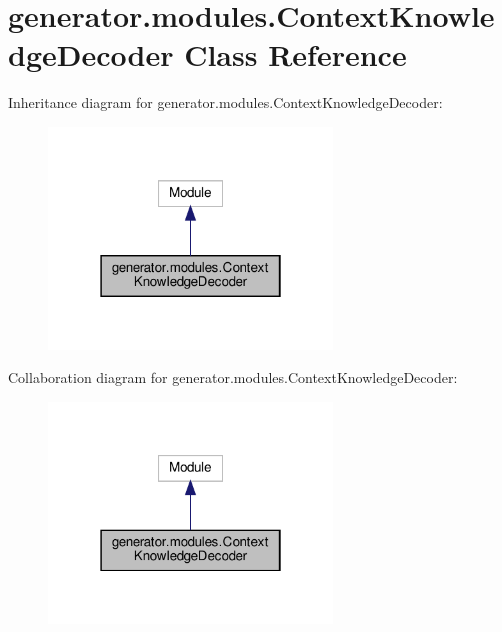 \hypertarget{classgenerator_1_1modules_1_1ContextKnowledgeDecoder}{}\section{generator.\+modules.\+Context\+Knowledge\+Decoder Class Reference}
\label{classgenerator_1_1modules_1_1ContextKnowledgeDecoder}


Inheritance diagram for generator.\+modules.\+Context\+Knowledge\+Decoder\+:
\nopagebreak
\begin{figure}[H]
\begin{center}
\leavevmode
\includegraphics[width=214pt]{classgenerator_1_1modules_1_1ContextKnowledgeDecoder__inherit__graph}
\end{center}
\end{figure}


Collaboration diagram for generator.\+modules.\+Context\+Knowledge\+Decoder\+:
\nopagebreak
\begin{figure}[H]
\begin{center}
\leavevmode
\includegraphics[width=214pt]{classgenerator_1_1modules_1_1ContextKnowledgeDecoder__coll__graph}
\end{center}
\end{figure}
